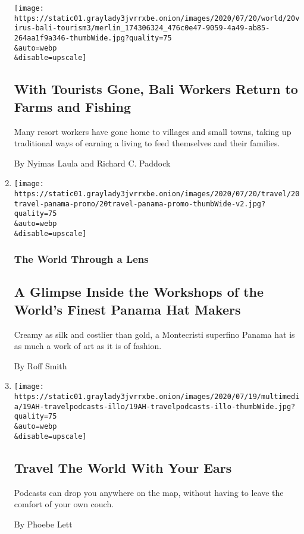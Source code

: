 \begin{enumerate}
  \texttt{[image: https://static01.graylady3jvrrxbe.onion/images/2020/07/20/world/20virus-bali-tourism3/merlin\_174306324\_476c0e47-9059-4a49-ab85-264aa1f9a346-thumbWide.jpg?quality=75\\\&auto=webp\\\&disable=upscale]}

  \hypertarget{with-tourists-gone-bali-workers-return-to-farms-and-fishing}{%
  \subsection{With Tourists Gone, Bali Workers Return to Farms and
  Fishing}\label{with-tourists-gone-bali-workers-return-to-farms-and-fishing}}

  Many resort workers have gone home to villages and small towns, taking
  up traditional ways of earning a living to feed themselves and their
  families.

  By Nyimas Laula and Richard C. Paddock
\item
  \href{/2020/07/20/travel/panama-hats-ecuador.html}{}

  \texttt{[image: https://static01.graylady3jvrrxbe.onion/images/2020/07/20/travel/20travel-panama-promo/20travel-panama-promo-thumbWide-v2.jpg?quality=75\\\&auto=webp\\\&disable=upscale]}

  \hypertarget{the-world-through-a-lens-2}{%
  \subsubsection{The World Through a
  Lens}\label{the-world-through-a-lens-2}}

  \hypertarget{a-glimpse-inside-the-workshops-of-the-worlds-finest-panama-hat-makers}{%
  \subsection{A Glimpse Inside the Workshops of the World's Finest
  Panama Hat
  Makers}\label{a-glimpse-inside-the-workshops-of-the-worlds-finest-panama-hat-makers}}

  Creamy as silk and costlier than gold, a Montecristi superfino Panama
  hat is as much a work of art as it is of fashion.

  By Roff Smith
\item
  \href{/2020/07/18/at-home/coronavirus-travel-podcasts.html}{}

  \texttt{[image: https://static01.graylady3jvrrxbe.onion/images/2020/07/19/multimedia/19AH-travelpodcasts-illo/19AH-travelpodcasts-illo-thumbWide.jpg?quality=75\\\&auto=webp\\\&disable=upscale]}

  \hypertarget{travel-the-world-with-your-ears}{%
  \subsection{Travel The World With Your
  Ears}\label{travel-the-world-with-your-ears}}

  Podcasts can drop you anywhere on the map, without having to leave the
  comfort of your own couch.

  By Phoebe Lett
\end{enumerate}

